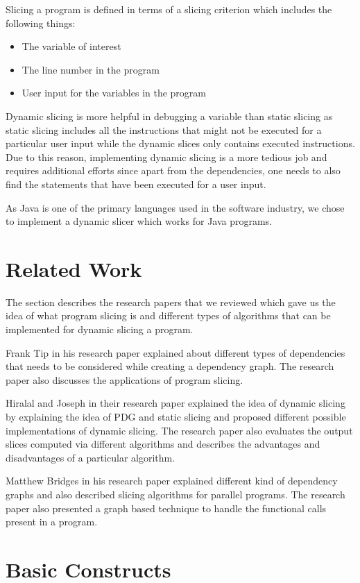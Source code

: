 \documentclass[conference]{IEEEtran}
\begin{document}
Slicing a program is defined in terms of a slicing criterion which includes the following things:
\begin{itemize}
    \item The variable of interest
    \item The line number in the program
    \item User input for the variables in the program
\end{itemize}

Dynamic slicing is more helpful in debugging a variable than static slicing as static slicing includes all the instructions that might not be executed for a particular user input while the dynamic slices only contains executed instructions. Due to this reason, implementing dynamic slicing is a more tedious job and requires additional efforts since apart from the dependencies, one needs to also find the statements that have been executed for a user input.

As Java is one of the primary languages used in the software industry, we chose to implement a dynamic slicer which works for Java programs.

\section{Related Work}
The section describes the research papers that we reviewed which gave us the idea of what program slicing is and different types of algorithms that can be implemented for dynamic slicing a program.

Frank Tip in his research paper\cite{b2} explained about different types of dependencies that needs to be considered while creating a dependency graph. The research paper also discusses the applications of program slicing. 

Hiralal and Joseph in their research paper\cite{b1} explained the idea of dynamic slicing by explaining the idea of PDG and static slicing and proposed different possible implementations of dynamic slicing. The research paper also evaluates the output slices computed via different algorithms and describes the advantages and disadvantages of a particular algorithm. 

Matthew Bridges in his research paper\cite{b3} explained different kind of dependency graphs and also described slicing algorithms for parallel programs. The research paper also presented a graph based technique to handle the functional calls present in a program. 

\section{Basic Constructs}
\end{document}
